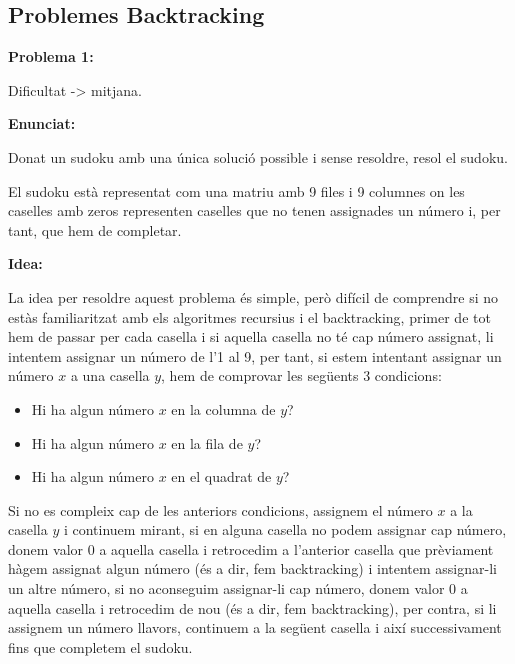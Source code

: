 \subsection{Problemes Backtracking}

\textbf{Problema 1:} \newline

Dificultat -> mitjana. \newline

\textbf{Enunciat:} \newline

Donat un sudoku amb una única solució possible i sense resoldre, resol el sudoku. \newline

El sudoku està representat com una matriu amb 9 files i 9 columnes on les caselles amb zeros representen caselles que no tenen assignades un número i, per tant, que hem de completar.
\newline

\textbf{Idea:} \newline

La idea per resoldre aquest problema és simple, però difícil de comprendre si no estàs familiaritzat amb els algoritmes recursius i el backtracking, primer de tot hem de passar per cada casella i si aquella casella no té cap número assignat, li intentem assignar un número de l'1 al 9, per tant, si estem intentant assignar un número $x$ a una casella $y$, hem de comprovar les següents 3 condicions:

\begin{itemize}
\item Hi ha algun número $x$ en la columna de $y$?
\item Hi ha algun número $x$ en la fila de $y$?
\item Hi ha algun número $x$ en el quadrat de $y$?
\end{itemize}

Si no es compleix cap de les anteriors condicions,  assignem el número $x$ a la casella $y$ i continuem mirant, si en alguna casella no podem assignar cap número, donem valor 0 a aquella casella i retrocedim a l'anterior casella que prèviament hàgem assignat algun número (és a dir, fem backtracking) i intentem assignar-li un altre número, si no aconseguim assignar-li cap número, donem valor 0 a aquella casella i retrocedim de nou (és a dir, fem backtracking), per contra, si li assignem un número llavors, continuem a la següent casella i així successivament fins que completem el sudoku. \newline

